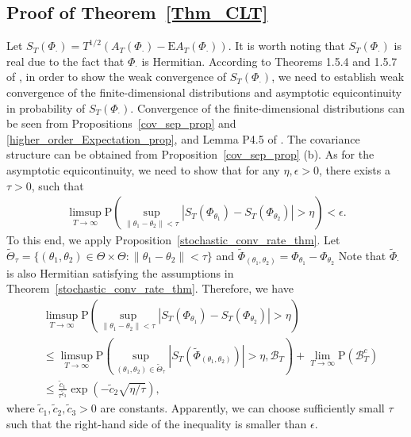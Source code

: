 \documentclass[11pt]{article}
\numberwithin{equation}{section}
\theoremstyle{plain}
\theoremstyle{definition}
\theoremstyle{definition}
\theoremstyle{assumption}
\theoremstyle{proposition}
\theoremstyle{proposition}
\theoremstyle{example}
\theoremstyle{lemma}
\theoremstyle{theorem}
\theoremstyle{remark}
\begin{document}
\subsection{Proof of Theorem~\ref{Thm_CLT}}\label{proof_CLT_sect}
Let $S_T(\Phi_{\cdot}) = T^{1/2}(A_T(\Phi_{\cdot}) - \mathrm{E}A_T(\Phi_{\cdot}))$. It is worth noting that $S_T(\Phi_{\cdot})$ is real due to the fact that $\Phi_{\cdot}$ is Hermitian. According to Theorems 1.5.4 and 1.5.7 of \citet{van_der_vaart_and_wellner1996}, in order to show the weak convergence of $S_T(\Phi_{\cdot})$, we need to establish weak convergence of the finite-dimensional distributions and asymptotic equicontinuity in probability of $S_T(\Phi_{\cdot})$. Convergence of the finite-dimensional distributions can be seen from Propositions~\ref{cov_sep_prop} and \ref{higher_order_Expectation_prop}, and Lemma P4.5 of \citet{Brillinger2001}. The covariance structure can be obtained from Proposition~\ref{cov_sep_prop} (b). As for the asymptotic
equicontinuity, we need to show that for any $\eta,\epsilon>0$, there exists a $\tau>0$, such that
\begin{align*}
\limsup_{T\rightarrow\infty}\mathrm{P}\left(\sup_{\|\theta_1 - \theta_2\| < \tau}|S_T(\Phi_{\theta_1}) - S_T(\Phi_{\theta_2})|>\eta\right)<\epsilon .    
\end{align*}
To this end, we apply Proposition~\ref{stochastic_conv_rate_thm}. Let $\tilde{\Theta}_{\tau} = \{(\theta_1,\theta_2)\in\Theta\times\Theta:\|\theta_1 - \theta_2\| < \tau\}$ and $\tilde{\Phi}_{(\theta_1,\theta_2)} = \Phi_{\theta_1} - \Phi_{\theta_2}$  Note that $\tilde{\Phi}_{\cdot}$ is also Hermitian satisfying the assumptions in Theorem~\ref{stochastic_conv_rate_thm}. 
Therefore, we have
\begin{align*}
&\limsup_{T\rightarrow\infty}\mathrm{P}\left(\sup_{\|\theta_1 - \theta_2\| < \tau}|S_T(\Phi_{\theta_1}) - S_T(\Phi_{\theta_2})|>\eta\right) \\
&\leqslant \limsup_{T\rightarrow\infty}\mathrm{P}\left(\sup_{(\theta_1,\theta_2)\in\tilde{\Theta}_{\tau}}|S_T(\tilde{\Phi}_{(\theta_1, \theta_2)})|>\eta, \mathcal{B}_T\right) + \lim_{T\rightarrow\infty}\mathrm{P}(\mathcal{B}_T^c) \\
&\leqslant \frac{\tilde{c}_1}{\tau^{\tilde{c}_3}}\exp(-\tilde{c}_2\sqrt{\eta/\tau}),
\end{align*}
where $\tilde{c}_1,\tilde{c}_2,\tilde{c}_3>0$ are constants. Apparently, we can choose sufficiently small $\tau$ such that the right-hand side of the inequality is smaller than $\epsilon$.
\end{document}
